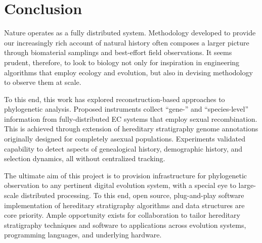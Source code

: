 \section{Conclusion} \label{sec:conclusion}

Nature operates as a fully distributed system.
Methodology developed to provide our increasingly rich account of natural history often composes a larger picture through biomaterial samplings and best-effort field observations.
It seems prudent, therefore, to look to biology not only for inspiration in engineering algorithms that employ ecology and evolution, but also in devising methodology to observe them at scale.

To this end, this work has explored reconstruction-based approaches to phylogenetic analysis.
Proposed instruments collect ``gene-'' and ``species-level'' information from fully-distributed EC systems that employ sexual recombination.
This is achieved through extension of hereditary stratigraphy genome annotations originally designed for completely asexual populations.
Experiments validated capability to detect aspects of genealogical history, demographic history, and selection dynamics, all without centralized tracking.

The ultimate aim of this project is to provision infrastructure for phylogenetic observation to any pertinent digital evolution system, with a special eye to large-scale distributed processing.
To this end, open source, plug-and-play software implementation of hereditary stratigraphy algorithms and data structures are core priority.
Ample opportunity exists for collaboration to tailor hereditary stratigraphy techniques and software to applications across evolution systems, programming languages, and underlying hardware.
